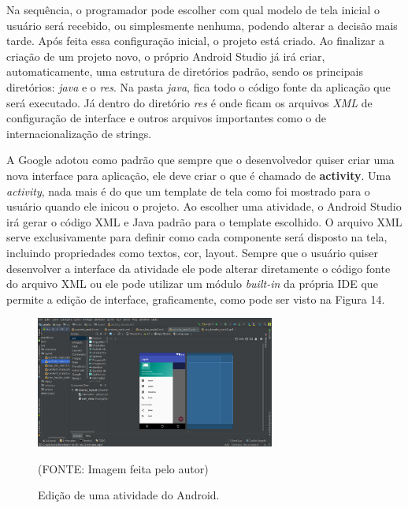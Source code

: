 \documentclass[
    12pt,       %
    openright,      %
    twoside,      %
    a4paper,      %
    english,      %
    french,       %
    spanish,      %
    brazil,       %
    ]{abntex2}
\begin{document}
        Na sequência, o programador pode escolher com qual modelo de tela inicial o usuário será
        recebido, ou simplesmente nenhuma, podendo alterar a decisão mais tarde. Após feita essa
        configuração inicial, o projeto está criado. Ao finalizar a criação de um projeto novo,
        o próprio Android Studio já irá criar, automaticamente, uma estrutura de diretórios padrão,
        sendo os principais diretórios: \textit{java} e o \textit{res}. Na pasta \textit{java},
        fica todo o código fonte da aplicação que será executado. Já dentro do diretório
        \textit{res} é onde ficam os arquivos \textit{XML} de configuração de interface e outros
        arquivos importantes como o de internacionalização de strings.

        A Google adotou como padrão que sempre que o desenvolvedor quiser criar uma nova interface
        para aplicação, ele deve criar o que é chamado de \textbf{activity}. Uma \textit{activity},
        nada mais é do que um template de tela como foi mostrado para o usuário quando ele inicou o
        projeto. Ao escolher uma atividade, o Android Studio irá gerar o código XML e Java padrão
        para o template escolhido. O arquivo XML serve exclusivamente para definir como cada
        componente será disposto na tela, incluindo propriedades como textos, cor, layout. Sempre
        que o usuário quiser desenvolver a interface da atividade ele pode alterar diretamente
        o código fonte do arquivo XML ou ele pode utilizar um módulo \textit{built-in} da própria
        IDE que permite a edição de interface, graficamente, como pode ser visto na Figura 14.

        \begin{figure}[htbp]
            \begin{center}
                \includegraphics[width=0.7\textwidth]{img/interfaceEditing.png}
            \end{center}
        \caption{\label{fig:passaro}Edição de uma atividade do Android.}
        \begin{center}(FONTE: Imagem feita pelo autor)\end{center}
        \end{figure}
\end{document}
